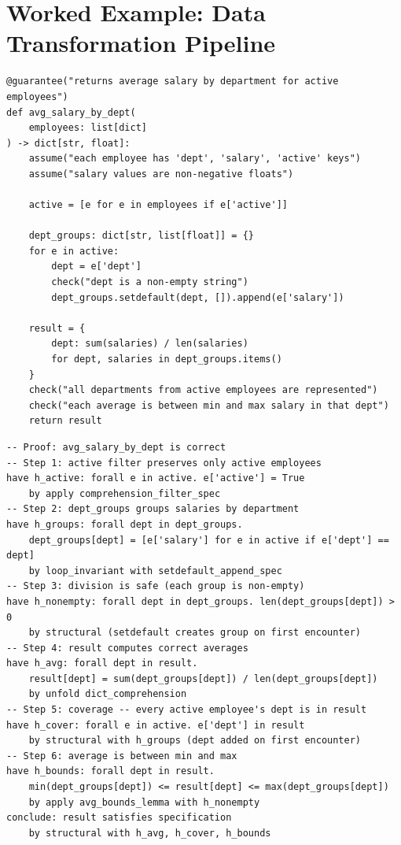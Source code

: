 \documentclass[11pt,a4paper]{report}
\theoremstyle{definition}
\theoremstyle{plain}
\begin{document}
\section{Worked Example: Data Transformation Pipeline}

\begin{lstlisting}[style=synhopy]
@guarantee("returns average salary by department for active employees")
def avg_salary_by_dept(
    employees: list[dict]
) -> dict[str, float]:
    assume("each employee has 'dept', 'salary', 'active' keys")
    assume("salary values are non-negative floats")

    active = [e for e in employees if e['active']]

    dept_groups: dict[str, list[float]] = {}
    for e in active:
        dept = e['dept']
        check("dept is a non-empty string")
        dept_groups.setdefault(dept, []).append(e['salary'])

    result = {
        dept: sum(salaries) / len(salaries)
        for dept, salaries in dept_groups.items()
    }
    check("all departments from active employees are represented")
    check("each average is between min and max salary in that dept")
    return result
\end{lstlisting}

\begin{lstlisting}[style=proof]
-- Proof: avg_salary_by_dept is correct
-- Step 1: active filter preserves only active employees
have h_active: forall e in active. e['active'] = True
    by apply comprehension_filter_spec
-- Step 2: dept_groups groups salaries by department
have h_groups: forall dept in dept_groups.
    dept_groups[dept] = [e['salary'] for e in active if e['dept'] == dept]
    by loop_invariant with setdefault_append_spec
-- Step 3: division is safe (each group is non-empty)
have h_nonempty: forall dept in dept_groups. len(dept_groups[dept]) > 0
    by structural (setdefault creates group on first encounter)
-- Step 4: result computes correct averages
have h_avg: forall dept in result.
    result[dept] = sum(dept_groups[dept]) / len(dept_groups[dept])
    by unfold dict_comprehension
-- Step 5: coverage -- every active employee's dept is in result
have h_cover: forall e in active. e['dept'] in result
    by structural with h_groups (dept added on first encounter)
-- Step 6: average is between min and max
have h_bounds: forall dept in result.
    min(dept_groups[dept]) <= result[dept] <= max(dept_groups[dept])
    by apply avg_bounds_lemma with h_nonempty
conclude: result satisfies specification
    by structural with h_avg, h_cover, h_bounds
\end{lstlisting}
\end{document}
